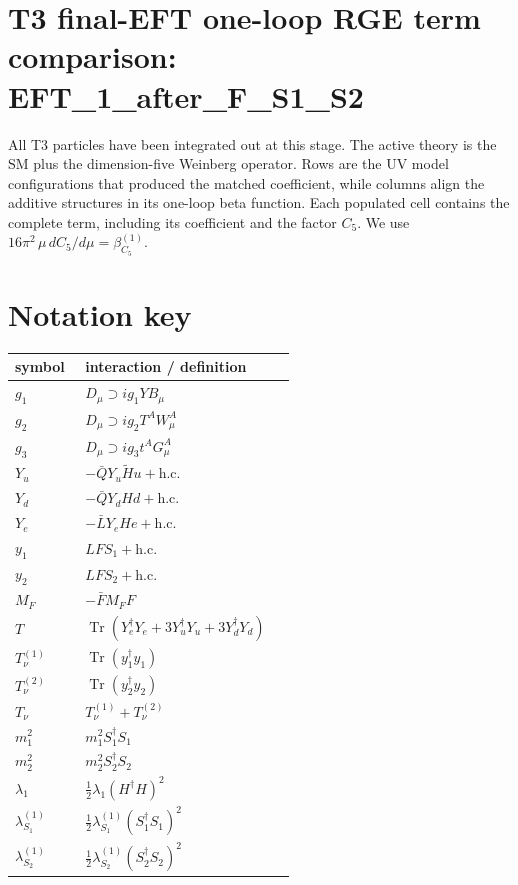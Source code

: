 \documentclass[8pt]{article}
\begin{document}
\begin{landscape}
\section*{T3 final-EFT one-loop RGE term comparison: EFT\_1\_after\_F\_S1\_S2}
All T3 particles have been integrated out at this stage. The active theory is the SM plus the dimension-five Weinberg operator. Rows are the UV model configurations that produced the matched coefficient, while columns align the additive structures in its one-loop beta function. Each populated cell contains the complete term, including its coefficient and the factor $C_5$.
\medskip
We use $16\pi^2\,\mu\,dC_5/d\mu=\beta_{C_5}^{(1)}$.
\section*{Notation key}
\begin{longtable}{@{}p{0.23\linewidth}p{0.69\linewidth}@{}}
\toprule
symbol & interaction / definition \\
\midrule
$g_1$ & $D_\mu\supset i g_1YB_\mu$ \\
$g_2$ & $D_\mu\supset i g_2T^AW_\mu^A$ \\
$g_3$ & $D_\mu\supset i g_3t^AG_\mu^A$ \\
$Y_u$ & $-\bar QY_u\widetilde Hu+\mathrm{h.c.}$ \\
$Y_d$ & $-\bar QY_dHd+\mathrm{h.c.}$ \\
$Y_e$ & $-\bar LY_eHe+\mathrm{h.c.}$ \\
$y_1$ & $LFS_1+\mathrm{h.c.}$ \\
$y_2$ & $LFS_2+\mathrm{h.c.}$ \\
$M_F$ & $-\bar FM_FF$ \\
$T$ & $\operatorname{Tr}(Y_e^\dagger Y_e+3Y_u^\dagger Y_u+3Y_d^\dagger Y_d)$ \\
$T_\nu^{(1)}$ & $\operatorname{Tr}(y_1^\dagger y_1)$ \\
$T_\nu^{(2)}$ & $\operatorname{Tr}(y_2^\dagger y_2)$ \\
$T_\nu$ & $T_\nu^{(1)}+T_\nu^{(2)}$ \\
$m_1^2$ & $m_1^2S_1^\dagger S_1$ \\
$m_2^2$ & $m_2^2S_2^\dagger S_2$ \\
$\lambda_1$ & $\frac12\lambda_1(H^\dagger H)^2$ \\
$\lambda_{S_1}^{(1)}$ & $\frac12\lambda_{S_1}^{(1)}(S_1^\dagger S_1)^2$ \\
$\lambda_{S_2}^{(1)}$ & $\frac12\lambda_{S_2}^{(1)}(S_2^\dagger S_2)^2$ \\

\end{longtable}
\end{landscape}
\end{document}
